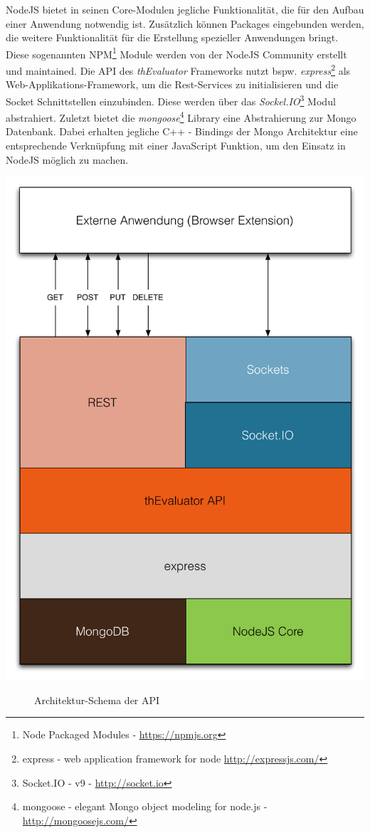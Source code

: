 NodeJS bietet in seinen Core-Modulen jegliche Funktionalität, die für den Aufbau einer Anwendung notwendig ist. Zusätzlich können Packages eingebunden werden, die weitere Funktionalität für die Erstellung spezieller Anwendungen bringt. Diese sogenannten NPM\footnote{Node Packaged Modules - \url{https://npmjs.org}} Module werden von der NodeJS Community erstellt und maintained. Die API des \textit{thEvaluator} Frameworks nutzt bspw. \textit{express}\footnote{express - web application framework for node \url{http://expressjs.com/}} als Web-Applikations-Framework, um die Rest-Services zu initialisieren und die Socket Schnittstellen einzubinden. Diese werden über das \textit{Sockel.IO}\footnote{Socket.IO - v9 - \url{http://socket.io}} Modul abstrahiert. Zuletzt bietet die \textit{mongoose}\footnote{mongoose - elegant Mongo object modeling for node.js - \url{http://mongoosejs.com/}} Library eine Abstrahierung zur Mongo Datenbank. Dabei erhalten jegliche C++ - Bindings der Mongo Architektur eine entsprechende Verknüpfung mit einer JavaScript Funktion, um den Einsatz in NodeJS möglich zu machen.

\begin{center}
\includegraphics[scale=0.49]{./images/api-architecture}
\end{center}
\begin{figure}[htb]
   \centering
   \caption{Architektur-Schema der API}
    \label{api}
\end{figure}

